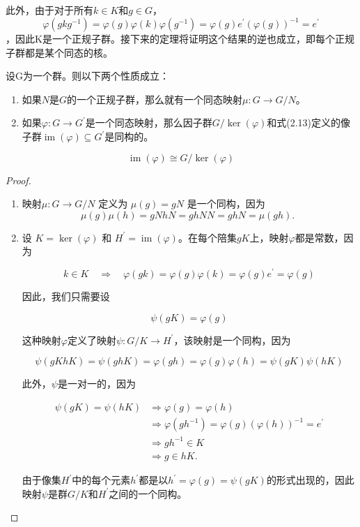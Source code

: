 此外，由于对于所有$k \in K$和$g \in G$，$$\varphi\left(g k g^{-1}\right)=\varphi(g) \varphi(k) \varphi\left(g^{-1}\right)=\varphi(g) e^{\prime}(\varphi(g))^{-1}=e^{\prime}$$，因此K是一个正规子群。接下来的定理将证明这个结果的逆也成立，即每个正规子群都是某个同态的核。
\begin{theorem}
    设G为一个群。则以下两个性质成立：

\begin{enumerate}
  \item 如果$N$是$G$的一个正规子群，那么就有一个同态映射$\mu: G \rightarrow G / N$。

  \item 如果$\varphi: G \rightarrow G^{\prime}$是一个同态映射，那么因子群$G / \operatorname{ker}(\varphi)$和式(2.13)定义的像子群$\operatorname{im}(\varphi) \subseteq G^{\prime}$是同构的。

\end{enumerate}

$$
\operatorname{im}(\varphi) \cong G / \operatorname{ker}(\varphi)
$$
\end{theorem}
\begin{proof}
    \begin{enumerate}

\item 映射$\mu: G \rightarrow G / N$ 定义为 $\mu(g)=g N$ 是一个同构，因为
$$
\mu(g) \mu(h)=g N h N=g h N N=g h N=\mu(g h) \text {. }
$$

\item 设 $K=\operatorname{ker}(\varphi)$ 和 $H^{\prime}=\operatorname{im}(\varphi)$。在每个陪集$g K$上，映射$\varphi$都是常数，因为

$$
k \in K \quad \Longrightarrow \quad \varphi(g k)=\varphi(g) \varphi(k)=\varphi(g) e^{\prime}=\varphi(g)
$$

因此，我们只需要设

$$
\psi(g K)=\varphi(g)
$$

这种映射$\varphi$定义了映射$\psi: G / K \rightarrow H^{\prime}$，该映射是一个同构，因为

$$
\psi(g K h K)=\psi(g h K)=\varphi(g h)=\varphi(g) \varphi(h)=\psi(g K) \psi(h K)
$$

此外，$\psi$是一对一的，因为

$$
\begin{aligned}
\psi(g K)=\psi(h K) & \Longrightarrow \varphi(g)=\varphi(h) \\
& \Longrightarrow \varphi\left(g h^{-1}\right)=\varphi(g)(\varphi(h))^{-1}=e^{\prime} \\
& \Longrightarrow g h^{-1} \in K \\
& \Longrightarrow g \in h K .
\end{aligned}
$$

由于像集$H^{\prime}$中的每个元素$h^{\prime}$都是以$h^{\prime}=\varphi(g)=\psi(g K)$的形式出现的，因此映射$\psi$是群$G / K$和$H^{\prime}$之间的一个同构。
\end{enumerate}
\end{proof}

